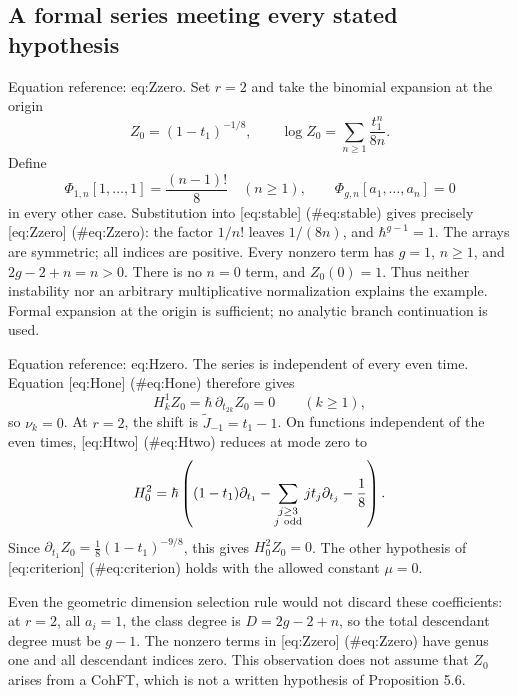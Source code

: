 \documentclass[10pt]{article}
\begin{document}
\subsection*{A formal series meeting every stated hypothesis}
Equation reference: eq:Zzero. Set \(r=2\) and take the binomial expansion at the origin \[
 Z_0=(1-t_1)^{-1/8},\qquad
 \log Z_0=\sum_{n\ge1}\frac{t_1^n}{8n}.\] Define \[\Phi_{1,n}[1,\ldots,1]=\frac{(n-1)!}{8}\quad(n\ge1),
 \qquad \Phi_{g,n}[a_1,\ldots,a_n]=0\] in every other case. Substitution into [eq:stable] (\#eq:stable) gives precisely [eq:Zzero] (\#eq:Zzero): the factor \(1/n!\) leaves \(1/(8n)\), and \(\hbar^{g-1}=1\). The arrays are symmetric; all indices are positive. Every nonzero term has \(g=1\), \(n\ge1\), and \(2g-2+n=n>0\). There is no \(n=0\) term, and \(Z_0(0)=1\). Thus neither instability nor an arbitrary multiplicative normalization explains the example. Formal expansion at the origin is sufficient; no analytic branch continuation is used.\par
Equation reference: eq:Hzero. The series is independent of every even time. Equation [eq:Hone] (\#eq:Hone) therefore gives \[H_k^1Z_0=\hbar\,\partial_{t_{2k}}Z_0=0
 \qquad(k\ge1),\] so \(\nu_k=0\). At \(r=2\), the shift is \(\widetilde J_{-1}=t_1-1\). On functions independent of the even times, [eq:Htwo] (\#eq:Htwo) reduces at mode zero to \[
 H_0^2=\hbar\left(
 (1-t_1)\partial_{t_1}
 -\sum_{\substack{j\ge3\\j\ {\rm odd}}}j t_j\partial_{t_j}
 -\frac18\right).\] Since \(\partial_{t_1}Z_0=\tfrac18(1-t_1)^{-9/8}\), this gives \(H_0^2Z_0=0\). The other hypothesis of [eq:criterion] (\#eq:criterion) holds with the allowed constant \(\mu=0\).\par
Even the geometric dimension selection rule would not discard these coefficients: at \(r=2\), all \(a_i=1\), the class degree is \(D=2g-2+n\), so the total descendant degree must be \(g-1\). The nonzero terms in [eq:Zzero] (\#eq:Zzero) have genus one and all descendant indices zero. This observation does not assume that \(Z_0\) arises from a CohFT, which is not a written hypothesis of Proposition 5.6.\par
\end{document}
